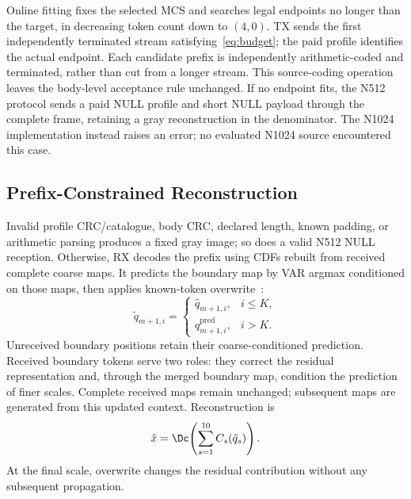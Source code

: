 Online fitting fixes the selected MCS and searches legal endpoints no longer than the target, in decreasing token count down to $(4,0)$. TX sends the first independently terminated stream satisfying~\eqref{eq:budget}; the paid profile identifies the actual endpoint. Each candidate prefix is independently arithmetic-coded and terminated, rather than cut from a longer stream. This source-coding operation leaves the body-level acceptance rule unchanged. If no endpoint fits, the N512 protocol sends a paid NULL profile and short NULL payload through the complete frame, retaining a gray reconstruction in the denominator. The N1024 implementation instead raises an error; no evaluated N1024 source encountered this case.

\ifCLASSOPTIONonecolumn\else\fi
\subsection{Prefix-Constrained Reconstruction}
Invalid profile CRC/catalogue, body CRC, declared length, known padding, or arithmetic parsing produces a fixed gray image; so does a valid N512 NULL reception. Otherwise, RX decodes the prefix using CDFs rebuilt from received complete coarse maps. It predicts the boundary map by VAR argmax conditioned on those maps, then applies known-token overwrite~\cite{var}:
\begin{equation}
 \tilde q_{m+1,i}=\begin{cases}\hat q_{m+1,i},&i\leq K,\\q^{\mathrm{pred}}_{m+1,i},&i>K.\end{cases}
 \label{eq:overwrite}
\end{equation}
Unreceived boundary positions retain their coarse-conditioned prediction. Received boundary tokens serve two roles: they correct the residual representation and, through the merged boundary map, condition the prediction of finer scales. Complete received maps remain unchanged; subsequent maps are generated from this updated context. Reconstruction is
\begin{equation}
 \hat x=\Dc\!\left(\sum_{s=1}^{10}C_s(\tilde q_s)\right).
 \label{eq:reconstruction}
\end{equation}
At the final scale, overwrite changes the residual contribution without any subsequent propagation.
